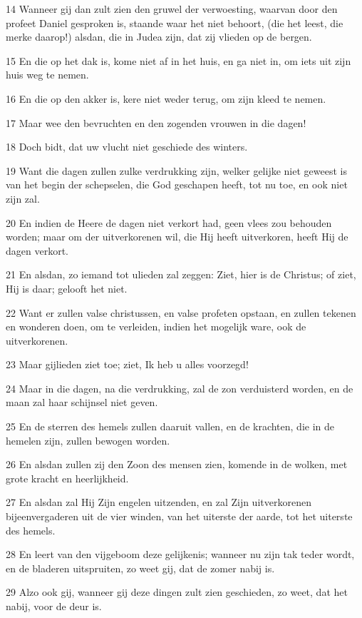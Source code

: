 \par 14 Wanneer gij dan zult zien den gruwel der verwoesting, waarvan door den profeet Daniel gesproken is, staande waar het niet behoort, (die het leest, die merke daarop!) alsdan, die in Judea zijn, dat zij vlieden op de bergen.
\par 15 En die op het dak is, kome niet af in het huis, en ga niet in, om iets uit zijn huis weg te nemen.
\par 16 En die op den akker is, kere niet weder terug, om zijn kleed te nemen.
\par 17 Maar wee den bevruchten en den zogenden vrouwen in die dagen!
\par 18 Doch bidt, dat uw vlucht niet geschiede des winters.
\par 19 Want die dagen zullen zulke verdrukking zijn, welker gelijke niet geweest is van het begin der schepselen, die God geschapen heeft, tot nu toe, en ook niet zijn zal.
\par 20 En indien de Heere de dagen niet verkort had, geen vlees zou behouden worden; maar om der uitverkorenen wil, die Hij heeft uitverkoren, heeft Hij de dagen verkort.
\par 21 En alsdan, zo iemand tot ulieden zal zeggen: Ziet, hier is de Christus; of ziet, Hij is daar; gelooft het niet.
\par 22 Want er zullen valse christussen, en valse profeten opstaan, en zullen tekenen en wonderen doen, om te verleiden, indien het mogelijk ware, ook de uitverkorenen.
\par 23 Maar gijlieden ziet toe; ziet, Ik heb u alles voorzegd!
\par 24 Maar in die dagen, na die verdrukking, zal de zon verduisterd worden, en de maan zal haar schijnsel niet geven.
\par 25 En de sterren des hemels zullen daaruit vallen, en de krachten, die in de hemelen zijn, zullen bewogen worden.
\par 26 En alsdan zullen zij den Zoon des mensen zien, komende in de wolken, met grote kracht en heerlijkheid.
\par 27 En alsdan zal Hij Zijn engelen uitzenden, en zal Zijn uitverkorenen bijeenvergaderen uit de vier winden, van het uiterste der aarde, tot het uiterste des hemels.
\par 28 En leert van den vijgeboom deze gelijkenis; wanneer nu zijn tak teder wordt, en de bladeren uitspruiten, zo weet gij, dat de zomer nabij is.
\par 29 Alzo ook gij, wanneer gij deze dingen zult zien geschieden, zo weet, dat het nabij, voor de deur is.
